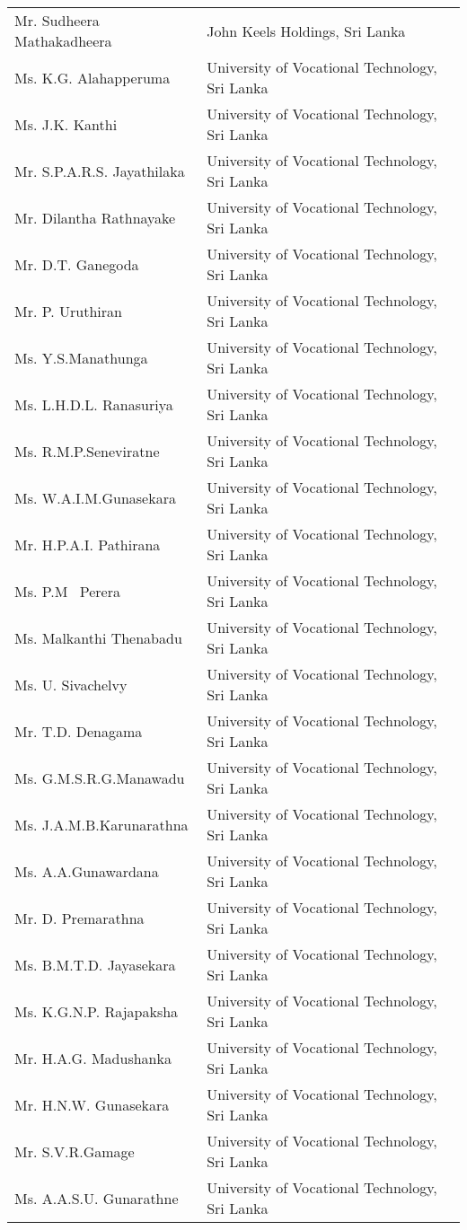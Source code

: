 \begin{longtable}{ L{4.8cm}  L{6.8cm} }
Mr. Sudheera Mathakadheera &  John Keels Holdings, Sri Lanka\\
Ms. K.G. Alahapperuma &  University of Vocational Technology, Sri Lanka\\
Ms. J.K. Kanthi &  University of Vocational Technology, Sri Lanka\\
Mr. S.P.A.R.S. Jayathilaka &  University of Vocational Technology, Sri Lanka\\
Mr. Dilantha Rathnayake &  University of Vocational Technology, Sri Lanka\\
Mr. D.T. Ganegoda &  University of Vocational Technology, Sri Lanka\\
Mr. P. Uruthiran &  University of Vocational Technology, Sri Lanka\\
Ms. Y.S.Manathunga &  University of Vocational Technology, Sri Lanka\\
Ms. L.H.D.L. Ranasuriya &  University of Vocational Technology, Sri Lanka\\
Ms. R.M.P.Seneviratne &  University of Vocational Technology, Sri Lanka\\
Ms. W.A.I.M.Gunasekara &  University of Vocational Technology, Sri Lanka\\
Mr. H.P.A.I. Pathirana &  University of Vocational Technology, Sri Lanka\\
Ms. P.M  Perera &  University of Vocational Technology, Sri Lanka\\
Ms. Malkanthi Thenabadu &  University of Vocational Technology, Sri Lanka\\
Ms. U. Sivachelvy &  University of Vocational Technology, Sri Lanka\\
Mr. T.D. Denagama &  University of Vocational Technology, Sri Lanka\\
Ms. G.M.S.R.G.Manawadu &  University of Vocational Technology, Sri Lanka\\
Ms. J.A.M.B.Karunarathna &  University of Vocational Technology, Sri Lanka\\
Ms. A.A.Gunawardana &  University of Vocational Technology, Sri Lanka\\
Mr. D. Premarathna &  University of Vocational Technology, Sri Lanka\\
Ms. B.M.T.D. Jayasekara &  University of Vocational Technology, Sri Lanka\\
Ms. K.G.N.P. Rajapaksha &  University of Vocational Technology, Sri Lanka\\
Mr. H.A.G. Madushanka &  University of Vocational Technology, Sri Lanka\\
Mr. H.N.W. Gunasekara &  University of Vocational Technology, Sri Lanka\\
Mr. S.V.R.Gamage &  University of Vocational Technology, Sri Lanka\\
Ms. A.A.S.U. Gunarathne &  University of Vocational Technology, Sri Lanka\\
\end{longtable}    
\newpage
\singlespacing